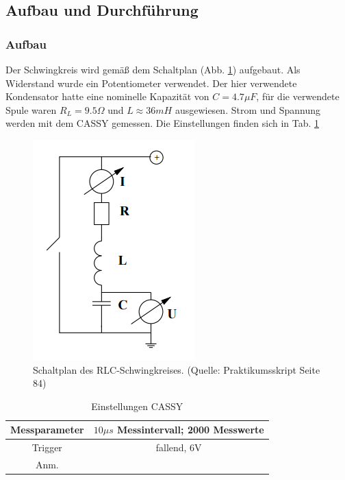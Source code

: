 \documentclass[12pt,a4paper]{article}
\begin{document}
\subsection{Aufbau und Durchführung}
\subsubsection{Aufbau}

Der Schwingkreis wird gemäß dem Schaltplan (Abb. \ref{fig:RLCSchaltung}) aufgebaut. Als Widerstand wurde ein Potentiometer verwendet. Der hier verwendete Kondensator hatte eine nominelle Kapazität von $C=4.7 \mu F$, für die verwendete Spule waren $R_L=9.5 \Omega$ und $L \approx 36mH$ ausgewiesen. Strom und Spannung werden mit dem CASSY gemessen. Die Einstellungen finden sich in Tab. \ref{tab:CASSY}

\begin{figure}
\begin{center}
\includegraphics[scale=0.8]{Bilder/RLCSchaltung.png}
\end{center}
\caption[RLC Schaltung]{Schaltplan des RLC-Schwingkreises. (Quelle: Praktikumsskript Seite 84)}
\label{fig:RLCSchaltung}
\end{figure}

\begin{table}
\begin{center}
\begin{tabular}{|c|c|}
\hline
Messparameter &  $10 \mu s$ Messintervall;  2000 Messwerte \\
\hline
Trigger & fallend, 6V\\
\hline
Anm. & \\
\hline
\end{tabular}
\caption[CASSY]{Einstellungen CASSY}
\label{tab:CASSY}
\end{center}
\end{table}
\end{document}
